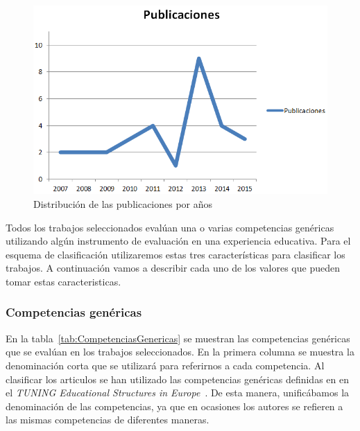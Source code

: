 \begin{figure}
  \begin{center}
    \includegraphics[scale=0.4]{PublicacionesAnuales.png}
  \end{center}
  \caption{Distribución de las publicaciones por años}
  \label{fig:PublicacionesAnuales}
\end{figure}



Todos los trabajos seleccionados evalúan una o varias competencias genéricas utilizando algún instrumento de evaluación en una experiencia educativa. Para el esquema de clasificación utilizaremos estas tres características para clasificar los trabajos. A continuación vamos a describir cada uno de los valores que pueden tomar estas caracteristicas.

\subsubsection{Competencias genéricas}


En la tabla~\ref{tab:CompetenciasGenericas} se muestran las competencias genéricas que se evalúan en los trabajos seleccionados. En la primera columna se muestra la denominación corta que se utilizará para referirnos a cada competencia. Al clasificar los articulos se han utilizado las competencias genéricas definidas en en el \emph{TUNING Educational Structures in Europe}~\cite{gonzalez2003tuning}. De esta manera, unificábamos la denominación de las competencias, ya que en ocasiones los autores se refieren a las mismas competencias de diferentes maneras.


